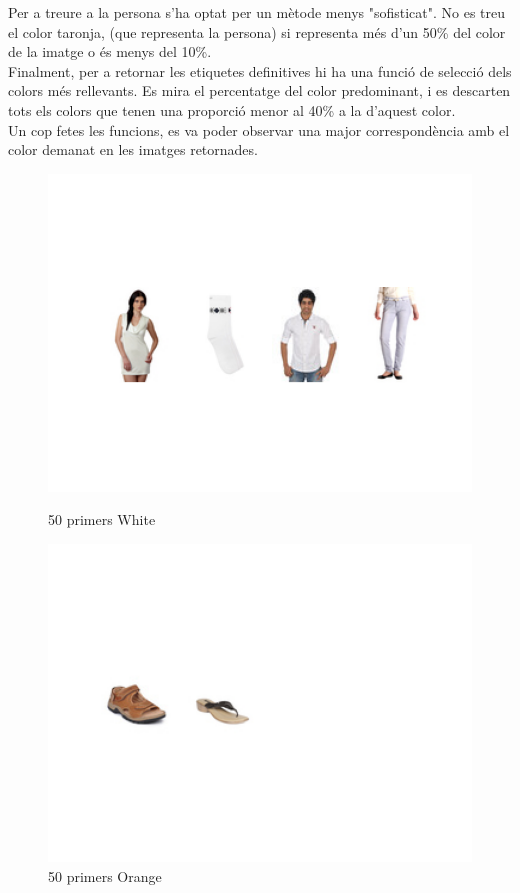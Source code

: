 \documentclass[a4paper, 11pt]{article}
\begin{document}
Per a treure a la persona s'ha optat per un mètode menys "sofisticat". No es treu el color taronja, (que representa la persona) si representa més d'un 50\% del color de la imatge o és menys del 10\%.\\
Finalment, per a retornar les etiquetes definitives hi ha una funció de selecció dels colors més rellevants. Es mira el percentatge del color predominant, i es descarten tots els colors que tenen una proporció menor al 40\% a la d'aquest color. \\
Un cop fetes les funcions, es va poder observar una major correspondència amb el color demanat en les imatges retornades.
\begin{figure}[h!]
\centering
\begin{minipage}{.5\textwidth}
  \centering
  \includegraphics[width=.7\linewidth]{blancos_buenos.png}
  \caption*{50 primers White}
\end{minipage}%
\begin{minipage}{.5\textwidth}
  \centering
  \includegraphics[width=.7\linewidth]{naranjito_bueno.png}
  \caption*{50 primers Orange}
\end{minipage}
\end{figure}
\end{document}
